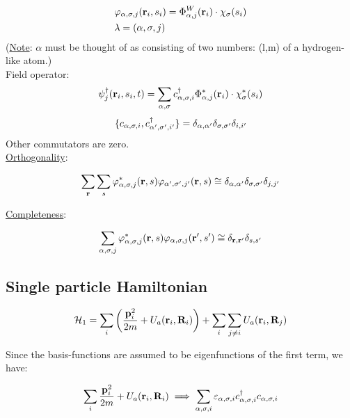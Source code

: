 \begin{align*}
	&\varphi_{\alpha, \sigma,j}(\vb{r}_i,s_i) = \Phi_{\alpha, j}^W (\vb{r}_i) \cdot \chi_\sigma (s_i)\\
	&\lambda = (\alpha, \sigma, j)
\end{align*}
(\uline{Note}: $\alpha$ must be thought of as consisting of two numbers: (l,m) of a hydrogen-like atom.)\\

\noindent Field operator:
\begin{align*}
	\psi^\dagger_j(\vb{r}_i, s_i, t)= \sum_{\alpha, \sigma} c^{\dagger}_{\alpha, \sigma, i} \Phi_{\alpha, j}^* (\vb{r}_i) \cdot \chi^*_\sigma (s_i)
\end{align*}
\begin{align*}
	\{ c_{\alpha, \sigma, i},c^{\dagger}_{\alpha', \sigma', i'} \} = \delta_{\alpha, \alpha'} \delta_{\sigma,\sigma'} \delta_{i,i'}
\end{align*}
Other commutators are zero.\\

\noindent \uline{Orthogonality}:

\begin{align*}
	\sum_{\vb{r}} \sum_s  \varphi^*_{\alpha, \sigma,j}(\vb{r},s)\varphi_{\alpha', \sigma',j'}(\vb{r},s) \cong \delta_{\alpha, \alpha'} \delta_{\sigma,\sigma'} \delta_{j,j'}
\end{align*}

\noindent \uline{Completeness}:

\begin{align*}
	\sum_{\alpha, \sigma, j} \varphi^*_{\alpha, \sigma,j}(\vb{r},s)\varphi_{\alpha, \sigma,j}(\vb{r}',s') \cong \delta_{\vb{r},\vb{r}'} \delta_{s,s'} 
\end{align*}

\subsection{Single particle Hamiltonian}
\begin{align*}
	\mathcal{H}_1 = \sum_i \left( \frac{\vb{p}_i^2}{2m}+ U_a (\vb{r}_i, \vb{R}_i) \right) + \sum_i \sum_{j \neq i} U_a ( \vb{r}_i, \vb{R}_j)
\end{align*}

\noindent Since the basis-functions are assumed to be eigenfunctions of the first term, we have:

\begin{equation}
	\sum_i  \frac{\vb{p}_i^2}{2m}+ U_a (\vb{r}_i, \vb{R}_i)\implies  \sum_{\alpha, \sigma, i} \varepsilon_{\alpha, \sigma, i} c^{\dagger}_{\alpha, \sigma, i} c_{\alpha, \sigma, i}
\end{equation}

